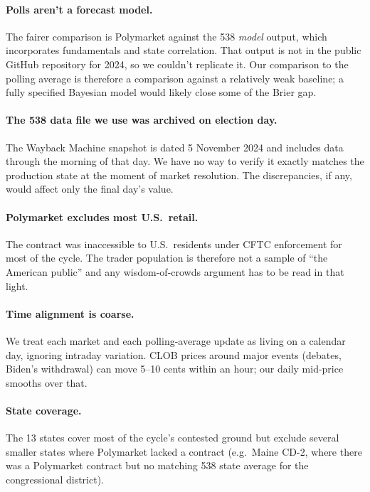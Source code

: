 \documentclass{article}
\begin{document}
\paragraph{Polls aren't a forecast model.}
The fairer comparison is Polymarket against the 538 \emph{model} output,
which incorporates fundamentals and state correlation. That output is
not in the public GitHub repository for 2024, so we couldn't replicate
it. Our comparison to the polling average is therefore a comparison
against a relatively weak baseline; a fully specified Bayesian model
would likely close some of the Brier gap.

\paragraph{The 538 data file we use was archived on election day.}
The Wayback Machine snapshot is dated 5 November 2024 and includes data
through the morning of that day. We have no way to verify it exactly
matches the production state at the moment of market resolution. The
discrepancies, if any, would affect only the final day's value.

\paragraph{Polymarket excludes most U.S.\ retail.}
The contract was inaccessible to U.S.\ residents under CFTC enforcement
for most of the cycle. The trader population is therefore not a sample
of ``the American public'' and any wisdom-of-crowds argument has to be
read in that light.

\paragraph{Time alignment is coarse.}
We treat each market and each polling-average update as living on a
calendar day, ignoring intraday variation. CLOB prices around major
events (debates, Biden's withdrawal) can move 5--10 cents within an
hour; our daily mid-price smooths over that.

\paragraph{State coverage.}
The 13 states cover most of the cycle's contested ground but exclude
several smaller states where Polymarket lacked a contract (e.g.\ Maine
CD-2, where there was a Polymarket contract but no matching 538 state
average for the congressional district).
\end{document}
